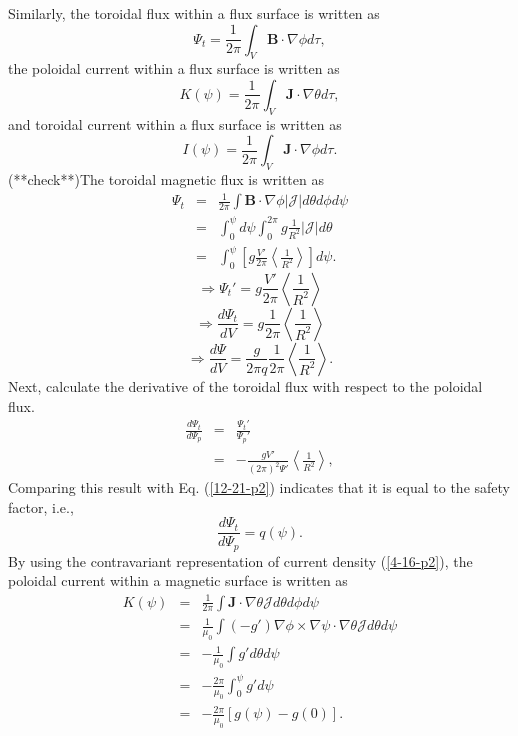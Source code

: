 \documentclass{article}
\begin{document}
Similarly, the toroidal flux within a flux surface is written as
\begin{equation}
  \Psi_t = \frac{1}{2 \pi} \int_V \mathbf{B} \cdot \nabla \phi d \tau,
\end{equation}
the poloidal current within a flux surface is written as
\begin{equation}
  K (\psi) = \frac{1}{2 \pi} \int_V \mathbf{J} \cdot \nabla \theta d \tau,
\end{equation}
and toroidal current within a flux surface is written as
\begin{equation}
  \label{4-18-1} I (\psi) = \frac{1}{2 \pi} \int_V \mathbf{J} \cdot \nabla
  \phi d \tau .
\end{equation}
(**check**)The toroidal magnetic flux is written as
\begin{eqnarray}
  \Psi_t & = & \frac{1}{2 \pi} \int \mathbf{B} \cdot \nabla \phi |\mathcal{J}|
  d \theta d \phi d \psi \nonumber\\
  & = & \int_0^{\psi} d \psi \int_0^{2 \pi} g \frac{1}{R^2} |\mathcal{J}| d
  \theta \nonumber\\
  & = & \int_0^{\psi} \left[ g \frac{V'}{2 \pi} \left\langle \frac{1}{R^2}
  \right\rangle \right] d \psi .  \label{4-7-p3}
\end{eqnarray}
\[ \Rightarrow \Psi_t' = g \frac{V'}{2 \pi} \left\langle \frac{1}{R^2}
   \right\rangle \]
\[ \Rightarrow \frac{d \Psi_t}{d V} = g \frac{1}{2 \pi} \left\langle
   \frac{1}{R^2} \right\rangle \]
\begin{equation}
  \Rightarrow \frac{d \Psi}{d V} = \frac{g}{2 \pi q}  \frac{1}{2 \pi}
  \left\langle \frac{1}{R^2} \right\rangle .
\end{equation}
Next, calculate the derivative of the toroidal flux with respect to the
poloidal flux.
\begin{eqnarray}
  \frac{d \Psi_t}{d \Psi_p} & = & \frac{\Psi_t'}{\Psi_p'} \nonumber\\
  & = & - \frac{g V'}{(2 \pi)^2 \Psi'}  \left\langle \frac{1}{R^2}
  \right\rangle,  \label{4-18-6}
\end{eqnarray}
Comparing this result with Eq. (\ref{12-21-p2}) indicates that it is equal to
the safety factor, i.e.,
\begin{equation}
  \label{5-14-3} \frac{d \Psi_t}{d \Psi_p} = q (\psi) .
\end{equation}
By using the contravariant representation of current density (\ref{4-16-p2}),
the poloidal current within a magnetic surface is written as
\begin{eqnarray}
  K (\psi) & = & \frac{1}{2 \pi} \int \mathbf{J} \cdot \nabla \theta
  \mathcal{J}d \theta d \phi d \psi \nonumber\\
  & = & \frac{1}{\mu_0} \int (- g') \nabla \phi \times \nabla \psi \cdot
  \nabla \theta \mathcal{J}d \theta d \psi \nonumber\\
  & = & - \frac{1}{\mu_0} \int g' d \theta d \psi \nonumber\\
  & = & - \frac{2 \pi}{\mu_0} \int_0^{\psi} g' d \psi \nonumber\\
  & = & - \frac{2 \pi}{\mu_0} [g (\psi) - g (0)] . 
\end{eqnarray}
\end{document}
